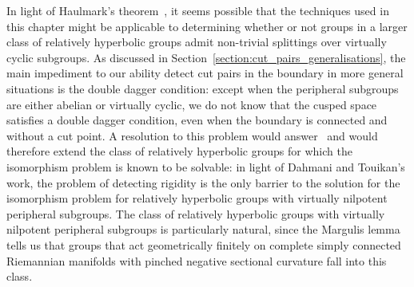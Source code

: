 In light of Haulmark's theorem~\cite{haulmark17}, it seems possible that the techniques used in this chapter might be applicable to determining whether or not groups in a larger class of relatively hyperbolic groups admit non-trivial splittings over virtually cyclic subgroups.
As discussed in Section~\ref{section:cut_pairs_generalisations}, the main impediment to our ability detect cut pairs in the boundary in more general situations is the double dagger condition: except when the peripheral subgroups are either abelian or virtually cyclic, we do not know that the cusped space satisfies a double dagger condition, even when the boundary is connected and without a cut point.
A resolution to this problem would answer~\cite[Question 1.8]{dahmanitouikan13} and would therefore extend the class of relatively hyperbolic groups for which the isomorphism problem is known to be solvable: in light of Dahmani and Touikan's work, the problem of detecting rigidity is the only barrier to the solution for the isomorphism problem for relatively hyperbolic groups with virtually nilpotent peripheral subgroups.
The class of relatively hyperbolic groups with virtually nilpotent peripheral subgroups is particularly natural, since the Margulis lemma tells us that groups that act geometrically finitely on complete simply connected Riemannian manifolds with pinched negative sectional curvature fall into this class.

